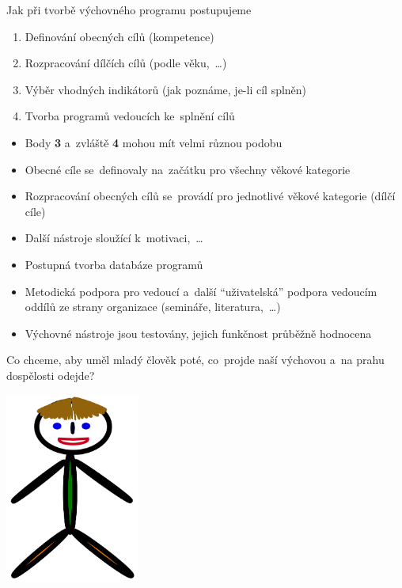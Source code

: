 \documentclass[compress, ucs, xelatex, 11pt, xcolor=dvipsnames, print, aspectratio=169,
	hyperref={
		bookmarks=true,
		unicode=true,
		colorlinks=true,
		pdftitle={Skautska vychovna metoda},
		plainpages=false,
		pdfauthor={Vojtech Zeisek},
		pdfsubject={Skautska vychovna metoda a jeji vyvoj za posledni stoleti a desetileti},
		pdfcreator={XeLaTeX},
		pdfkeywords={Junak, Pedagogika, Skaut, Skauting, Vychovna metoda},
		linkcolor=Red, %
		anchorcolor=ForestGreen, %
		citecolor=ForestGreen, %
		filecolor=ForestGreen, %
		menucolor=ForestGreen, %
		urlcolor=Sepia, %
		pdftex},
	url={hyphens, lowtilde} %
	]{beamer}
\begin{document}
\begin{frame}{Jak při tvorbě výchovného programu postupujeme}
	\begin{enumerate}
		\item Definování obecných cílů (kompetence)
		\item Rozpracování dílčích cílů (podle věku,~\ldots)
		\item Výběr vhodných indikátorů (jak poznáme, je-li cíl splněn)
		\item Tvorba programů vedoucích ke~splnění cílů
	\end{enumerate}
	\begin{itemize}
		\item Body \textbf{3} a~zvláště \textbf{4} mohou mít velmi různou podobu
		\item Obecné cíle se~definovaly na~začátku pro všechny věkové kategorie
		\item Rozpracování obecných cílů se~provádí pro jednotlivé věkové kategorie (dílčí cíle)
		\item Další nástroje sloužící k~motivaci,~\ldots
		\item Postupná tvorba databáze programů
		\item Metodická podpora pro vedoucí a~další \enquote{uživatelská} podpora vedoucím oddílů ze strany organizace (semináře, literatura,~\ldots)
		\item Výchovné nástroje jsou testovány, jejich funkčnost průběžně hodnocena
	\end{itemize}
\end{frame}

\begin{frame}{Co chceme, aby uměl mladý člověk poté, co~projde naší výchovou a~na prahu dospělosti odejde?}
	\begin{center}
		\includegraphics[height=6.25cm]{pepicek.png}
	\end{center}
\end{frame}
\end{document}
